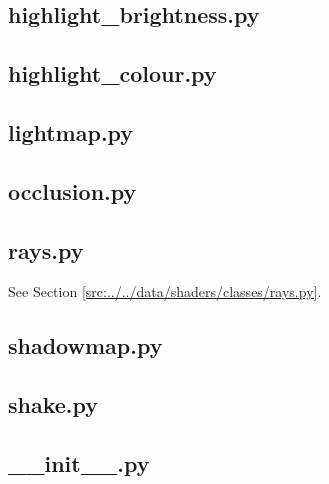 \documentclass[../main/main.tex]{subfiles}
\begin{document}
\subsection{highlight\_brightness.py}

\label{src:data/shaders/classes/highlight_brightness.py}

\subsection{highlight\_colour.py}

\label{src:data/shaders/classes/highlight_colour.py}

\subsection{lightmap.py}

\label{src:data/shaders/classes/lightmap.py}

\subsection{occlusion.py}

\label{src:data/shaders/classes/occlusion.py}

\subsection{rays.py}
See Section \ref{src:../../data/shaders/classes/rays.py}.

\subsection{shadowmap.py}

\label{src:data/shaders/classes/shadowmap.py}

\subsection{shake.py}

\label{src:data/shaders/classes/shake.py}

\subsection{\_\_init\_\_.py}

\label{src:data/shaders/classes/__init__.py}
\end{document}
